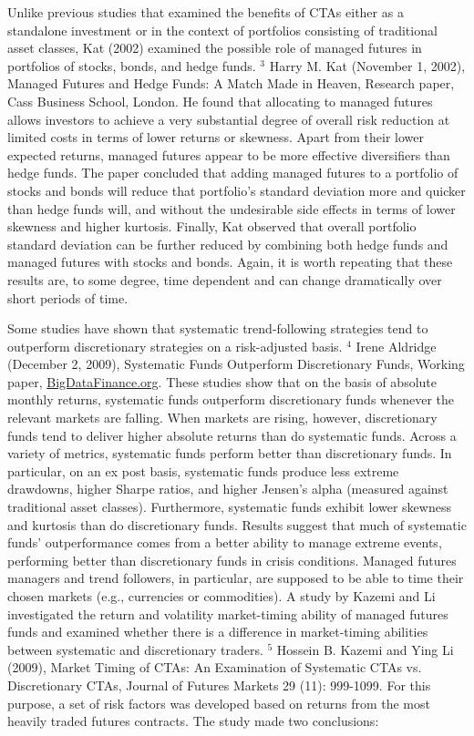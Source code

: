 \documentclass[11pt]{article}
\begin{document}
Unlike previous studies that examined the benefits of CTAs either as a standalone investment or in the context of portfolios consisting of traditional asset classes, Kat (2002) examined the possible role of managed futures in portfolios of stocks, bonds, and hedge funds. ${ }^{3}$ Harry M. Kat (November 1, 2002), Managed Futures and Hedge Funds: A Match Made in Heaven, Research paper, Cass Business School, London. He found that allocating to managed futures allows investors to achieve a very substantial degree of overall risk reduction at limited costs in terms of lower returns or skewness. Apart from their lower expected returns, managed futures appear to be more effective diversifiers than hedge funds. The paper concluded that adding managed futures to a portfolio of stocks and bonds will reduce that portfolio's standard deviation more and quicker than hedge funds will, and without the undesirable side effects in terms of lower skewness and higher kurtosis. Finally, Kat observed that overall portfolio standard deviation can be further reduced by combining both hedge funds and managed futures with stocks and bonds. Again, it is worth repeating that these results are, to some degree, time dependent and can change dramatically over short periods of time.

Some studies have shown that systematic trend-following strategies tend to outperform discretionary strategies on a risk-adjusted basis. ${ }^{4}$ Irene Aldridge (December 2, 2009), Systematic Funds Outperform Discretionary Funds, Working paper, \href{http://BigDataFinance.org}{BigDataFinance.org}. These studies show that on the basis of absolute monthly returns, systematic funds outperform discretionary funds whenever the relevant markets are falling. When markets are rising, however, discretionary funds tend to deliver higher absolute returns than do systematic funds. Across a variety of metrics, systematic funds perform better than discretionary funds. In particular, on an ex post basis, systematic funds produce less extreme drawdowns, higher Sharpe ratios, and higher Jensen's alpha (measured against traditional asset classes). Furthermore, systematic funds exhibit lower skewness and kurtosis than do discretionary funds. Results suggest that much of systematic funds' outperformance comes from a better ability to manage extreme events, performing better than discretionary funds in crisis conditions. Managed futures managers and trend followers, in particular, are supposed to be able to time their chosen markets (e.g., currencies or commodities). A study by Kazemi and Li investigated the return and volatility market-timing ability of managed futures funds and examined whether there is a difference in market-timing abilities between systematic and discretionary traders. ${ }^{5}$ Hossein B. Kazemi and Ying Li (2009), Market Timing of CTAs: An Examination of Systematic CTAs vs. Discretionary CTAs, Journal of Futures Markets 29 (11): 999-1099. For this purpose, a set of risk factors was developed based on returns from the most heavily traded futures contracts. The study made two conclusions:
\end{document}
